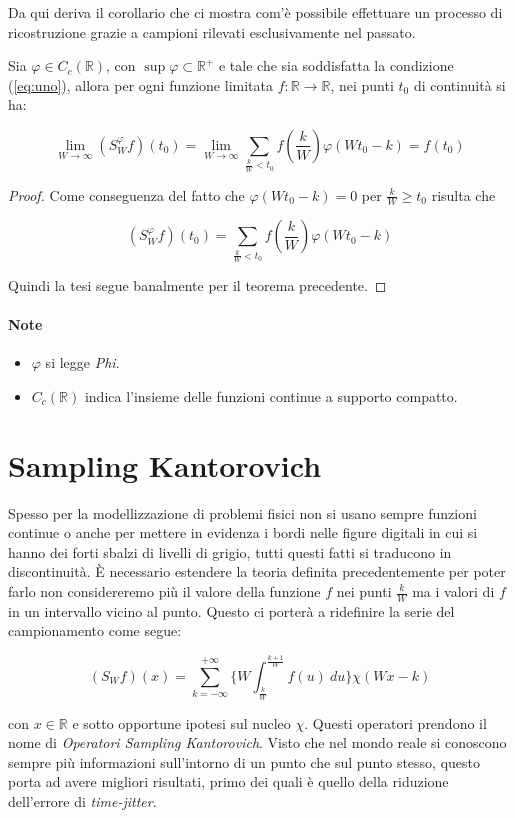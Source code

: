 Da qui deriva il corollario che ci mostra com'è possibile effettuare un processo
di ricostruzione grazie a campioni rilevati esclusivamente nel passato.

\begin{corollary}
    Sia $\varphi \in C_c(\mathbb{R})$, con $\sup \varphi \subset \mathbb{R}^+$ e
    tale che sia soddisfatta la condizione (\ref{eq:uno}), allora per ogni funzione limitata
    $f: \mathbb{R} \rightarrow \mathbb{R}$, nei punti $t_0$ di continuità si ha:

    $$
        \lim_{W \rightarrow \infty} (S_W^{\varphi}f)(t_0) = \lim_{W \rightarrow \infty} \sum_{\frac{k}{W} < t_0} f(\frac{k}{W}) \varphi(Wt_0 - k) = f(t_0)
    $$
\end{corollary}

\begin{proof}
    Come conseguenza del fatto che $\varphi(Wt_0-k) = 0$ per $\frac{k}{W} \ge t_0$ risulta che

    $$
        (S_W^{\varphi}f)(t_0) = \sum_{\frac{k}{W} < t_0} f(\frac{k}{W}) \varphi(Wt_0 - k)
    $$

    Quindi la tesi segue banalmente per il teorema precedente.
\end{proof}

\paragraph{Note}
\begin{itemize}
    \item $\varphi$ si legge \textit{Phi}.
    \item $C_c(\mathbb{R})$ indica l'insieme delle funzioni continue a supporto
          compatto.
\end{itemize}

\section{Sampling Kantorovich}

Spesso per la modellizzazione di problemi fisici non si usano sempre funzioni continue
o anche per mettere in evidenza i bordi nelle figure digitali in cui si hanno dei
forti sbalzi di livelli di grigio, tutti questi fatti si traducono in discontinuità.
È necessario estendere la teoria definita precedentemente per poter farlo non
considereremo più il valore della funzione $f$ nei punti $\frac{k}{W}$ ma i
valori di $f$ in un intervallo vicino al punto. Questo ci porterà a ridefinire
la serie del campionamento come segue:

$$
    (S_Wf)(x) = \sum_{k = - \infty}^{+ \infty} \{ W \int_{\frac{k}{W}}^{\frac{k+1}{W}} f(u) \ du \} \chi  (Wx-k)
$$

con $x \in \mathbb{R}$ e sotto opportune ipotesi sul nucleo $\chi$.
Questi operatori prendono il nome di \textit{Operatori Sampling Kantorovich}.
Visto che nel mondo reale si conoscono sempre più informazioni sull'intorno di
un punto che sul punto stesso, questo porta ad avere migliori risultati, primo dei
quali è quello della riduzione dell'errore di \textit{time-jitter}.